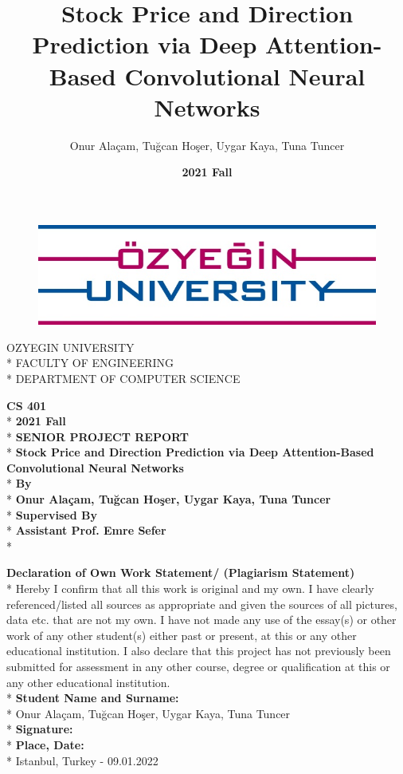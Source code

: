\documentclass{article}
\title{\textbf{Stock Price and Direction Prediction via Deep Attention-Based Convolutional Neural Networks}}
\author{Onur Alaçam, Tuğcan Hoşer, Uygar Kaya, Tuna Tuncer}
\date{\textbf{2021 Fall}}
\begin{document}
\begin{figure}[h]
    \begin{center}
        \includegraphics[]{Assets/OzU.png}
    \end{center}
\end{figure}

\begin{center}
    OZYEGIN UNIVERSITY\\*
    FACULTY OF ENGINEERING\\*
    DEPARTMENT OF COMPUTER SCIENCE
\end{center}

\begin{center}
    \textbf{CS 401}\\* \vspace{0.2cm}
    \textbf{2021 Fall}\\* \vspace{0.4cm}
    \textbf{SENIOR PROJECT REPORT}\\* \vspace{0.6cm}
    \textbf{Stock Price and Direction Prediction via Deep Attention-Based Convolutional Neural Networks}\\* \vspace{0.8cm}
    \textbf{By}\\*
    \textbf{Onur Alaçam, Tuğcan Hoşer, Uygar Kaya, Tuna Tuncer}\\* \vspace{0.6cm}
    \textbf{Supervised By}\\*
    \textbf{Assistant Prof. Emre Sefer}\\* \vspace{0.6cm}
\end{center}
\textbf{Declaration of Own Work Statement/ (Plagiarism Statement)}\\*
Hereby I confirm that all this work is original and my own. I have clearly referenced/listed all sources as appropriate and given the sources of all pictures, data etc. that are not my own. I have not made any use of the essay(s) or other work of any other student(s) either past or present, at this or any other educational institution. I also declare that this project has not previously been submitted for assessment in any other course, degree or qualification at this or any other educational institution.\vspace{0.2cm}\\*
\textbf{Student Name and Surname:}\\* Onur Alaçam, Tuğcan Hoşer, Uygar Kaya, Tuna Tuncer \vspace{0.1cm}\\*
\textbf{Signature:} \vspace{0.9cm}\\*
\textbf{Place, Date:}\\* Istanbul, Turkey - 09.01.2022
\end{document}
